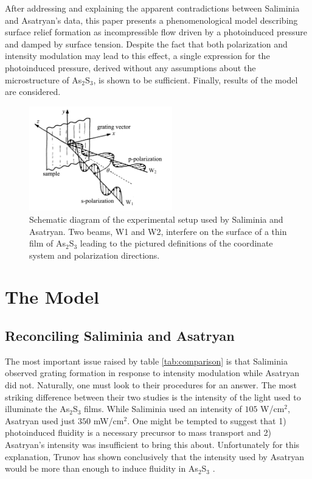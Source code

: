 \documentclass[twocolumn,showpacs,preprintnumbers,amsmath,amssymb]{revtex4}
\begin{document}
After addressing and explaining the apparent contradictions between
Saliminia and Asatryan's data, this paper presents a phenomenological
model describing surface relief formation as incompressible flow
driven by a photoinduced pressure and damped by surface
tension. Despite the fact that both polarization and intensity
modulation may lead to this effect, a single expression for the
photoinduced pressure, derived without any assumptions about the
microstructure of As$_2$S$_3$, is shown to be sufficient. Finally,
results of the model are considered.

\begin{figure}[!htbp]
  \includegraphics[width=2.45in]{figure/sppic.png}
  \caption{Schematic diagram of the experimental setup used by Saliminia and Asatryan.
                                Two beams, W1 and W2, interfere on the surface of a thin film of As$_{2}$S$_{3}$ leading
                                to the pictured definitions of the coordinate system and polarization directions.}
  \label{fig:setup}
\end{figure}

\section{The Model}

\subsection{Reconciling Saliminia and Asatryan}
\label{sec:chalcmod}
The most important issue raised by table \ref{tab:comparison} is that
Saliminia observed grating formation in response to intensity
modulation while Asatryan did not. Naturally, one must look to their
procedures for an answer. The most striking difference between their
two studies is the intensity of the light used to illuminate the
As$_{2}$S$_{3}$ films. While Saliminia used an intensity of $105$
W/cm$^{2}$, Asatryan used just $350$ mW/cm$^{2}$. One might be tempted
to suggest that 1) photoinduced fluidity is a necessary precursor to
mass transport and 2) Asatryan's intensity was insufficient to bring
this about. Unfortunately for this explanation, Trunov has shown
conclusively that the intensity used by Asatryan would be more than
enough to induce fluidity in As$_{2}$S$_{3}$ \cite{trunov03}.
\end{document}
